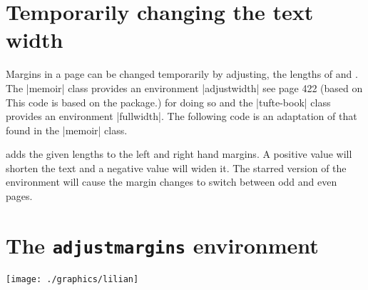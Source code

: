 \section{Temporarily changing the text width}

Margins in a page can be changed temporarily by adjusting, the lengths of  and . The |memoir| class provides an environment |adjustwidth| see page 422 (based on This code is based on the  package.) for doing so and the |tufte-book| class provides an environment |fullwidth|. The following code is an adaptation of that found in the |memoir| class.




adds the given lengths to the left and
right hand margins. A positive value will shorten the text and a negative value
will widen it. The starred version of the environment will cause the margin
changes to switch between odd and even pages. 



\eject
{}

\section*{The \texttt{adjustmargins} environment}
\lorem

\vfill\vfill
\begin{multicols}{2}
\lorem
\end{multicols}
\begin{minipage}{\paperwidth}
\centering


\medskip
\par
\noindent\texttt{[image: ./graphics/lilian]}\par%

\end{minipage}

